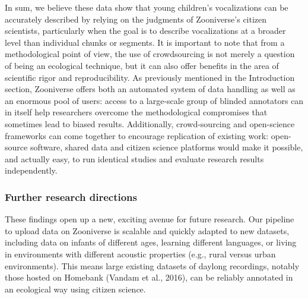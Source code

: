 \documentclass[english,,man]{apa6}
\begin{document}
In sum, we believe these data show that young children's vocalizations can be accurately described by relying on the judgments of Zooniverse's citizen scientists, particularly when the goal is to describe vocalizations at a broader level than individual chunks or segments. It is important to note that from a methodological point of view, the use of crowdsourcing is not merely a question of being an ecological technique, but it can also offer benefits in the area of scientific rigor and reproducibility. As previously mentioned in the Introduction section, Zooniverse offers both an automated system of data handling as well as an enormous pool of users: access to a large-scale group of blinded annotators can in itself help researchers overcome the methodological compromises that sometimes lead to biased results. Additionally, crowd-sourcing and open-science frameworks can come together to encourage replication of existing work: open-source software, shared data and citizen science platforms would make it possible, and actually easy, to run identical studies and evaluate research results independently.

\hypertarget{further-research-directions}{%
\subsubsection{Further research directions}\label{further-research-directions}}

These findings open up a new, exciting avenue for future research. Our pipeline to upload data on Zooniverse is scalable and quickly adapted to new datasets, including data on infants of different ages, learning different languages, or living in environments with different acoustic properties (e.g., rural versus urban environments). This means large existing datasets of daylong recordings, notably those hosted on Homebank (Vandam et al., 2016), can be reliably annotated in an ecological way using citizen science.
\end{document}
